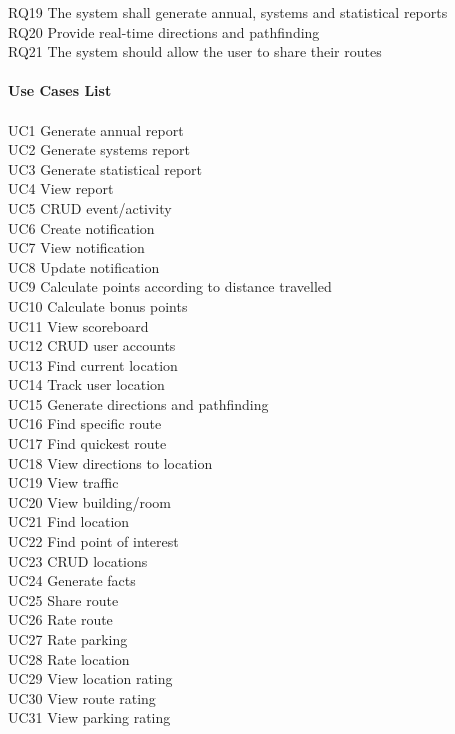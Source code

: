 \documentclass{article}
\begin{document}
{			RQ19 The system shall generate annual, systems and statistical reports\\
			RQ20 Provide real-time directions and pathfinding\\
			RQ21 The system should allow the user to share their routes\\\\
			\noindent\textbf{Use Cases List}\\\\
			UC1 Generate annual report\\
			UC2 Generate systems report\\
			UC3 Generate statistical report\\
			UC4 View report\\
			UC5 CRUD event/activity\\
			UC6 Create notification\\
			UC7 View notification\\
			UC8 Update notification\\
			UC9 Calculate points according to distance travelled\\
			UC10 Calculate bonus points\\
			UC11 View scoreboard\\
			UC12 CRUD user accounts\\
			UC13 Find current location\\
			UC14 Track user location\\
			UC15 Generate directions and pathfinding\\
			UC16 Find specific route\\
			UC17 Find quickest route\\
			UC18 View directions to location\\
			UC19 View traffic\\
			UC20 View building/room\\
			UC21 Find location\\
			UC22 Find point of interest\\
			UC23 CRUD locations\\
			UC24 Generate facts\\
			UC25 Share route\\
			UC26 Rate route\\
			UC27 Rate parking\\
			UC28 Rate location\\
			UC29 View location rating\\
			UC30 View route rating\\
			UC31 View parking rating\\
}
\end{document}
